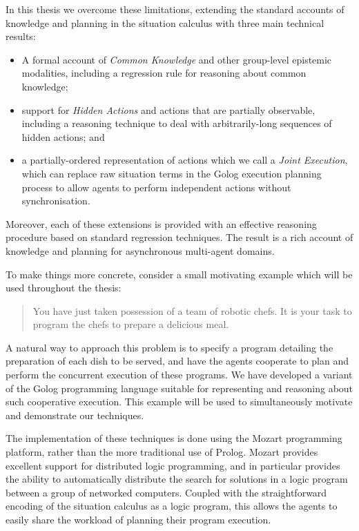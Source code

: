 In this thesis we overcome these limitations, extending the standard
accounts of knowledge and planning in the situation calculus with
three main technical results:

\begin{itemize}
\item A formal account of \emph{Common Knowledge} and other group-level
epistemic modalities, including a regression rule for reasoning about
common knowledge; 
\item support for \emph{Hidden Actions} and actions that are partially observable,
including a reasoning technique to deal with arbitrarily-long sequences
of hidden actions; and 
\item a partially-ordered representation of actions which we call a \emph{Joint
Execution}, which can replace raw situation terms in the Golog execution
planning process to allow agents to perform independent actions without
synchronisation. 
\end{itemize}
Moreover, each of these extensions is provided with an effective reasoning
procedure based on standard regression techniques. The result is a
rich account of knowledge and planning for asynchronous multi-agent
domains.

To make things more concrete, consider a small motivating example
which will be used throughout the thesis:

\begin{quote}
You have just taken possession of a team of robotic chefs. It is your
task to program the chefs to prepare a delicious meal. 
\end{quote}
A natural way to approach this problem is to specify a program detailing
the preparation of each dish to be served, and have the agents cooperate
to plan and perform the concurrent execution of these programs. We
have developed a variant of the Golog programming language suitable
for representing and reasoning about such cooperative execution. This
example will be used to simultaneously motivate and demonstrate our
techniques.

The implementation of these techniques is done using the Mozart programming
platform, rather than the more traditional use of Prolog. Mozart provides
excellent support for distributed logic programming, and in particular
provides the ability to automatically distribute the search for solutions
in a logic program between a group of networked computers. Coupled
with the straightforward encoding of the situation calculus as a logic
program, this allows the agents to easily share the workload of planning
their program execution.

